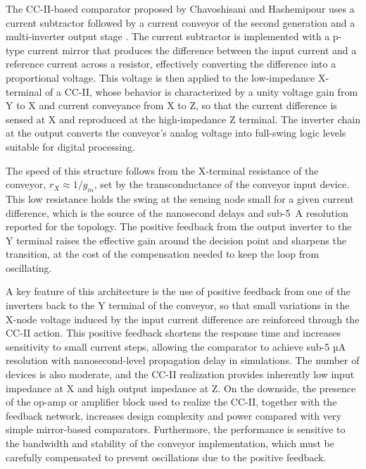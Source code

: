 The CC-II-based comparator proposed by Chavoshisani and Hashemipour uses a current subtractor followed by a current conveyor of the second generation and a multi-inverter output stage \cite{chavoshisani_2011}. The current subtractor is implemented with a p-type current mirror that produces the difference between the input current and a reference current across a resistor, effectively converting the difference into a proportional voltage. This voltage is then applied to the low-impedance X-terminal of a CC-II, whose behavior is characterized by a unity voltage gain from Y to X and current conveyance from X to Z, so that the current difference is sensed at X and reproduced at the high-impedance Z terminal. The inverter chain at the output converts the conveyor's analog voltage into full-swing logic levels suitable for digital processing.

The speed of this structure follows from the X-terminal resistance of the conveyor, $r_X \approx 1/g_m$, set by the transconductance of the conveyor input device. This low resistance holds the swing at the sensing node small for a given current difference, which is the source of the nanosecond delays and sub-5~\textmu A resolution reported for the topology. The positive feedback from the output inverter to the Y terminal raises the effective gain around the decision point and sharpens the transition, at the cost of the compensation needed to keep the loop from oscillating.

A key feature of this architecture is the use of positive feedback from one of the inverters back to the Y terminal of the conveyor, so that small variations in the X-node voltage induced by the input current difference are reinforced through the CC-II action. This positive feedback shortens the response time and increases sensitivity to small current steps, allowing the comparator to achieve sub-5 µA resolution with nanosecond-level propagation delay in simulations. The number of devices is also moderate, and the CC-II realization provides inherently low input impedance at X and high output impedance at Z. On the downside, the presence of the op-amp or amplifier block used to realize the CC-II, together with the feedback network, increases design complexity and power compared with very simple mirror-based comparators. Furthermore, the performance is sensitive to the bandwidth and stability of the conveyor implementation, which must be carefully compensated to prevent oscillations due to the positive feedback.












